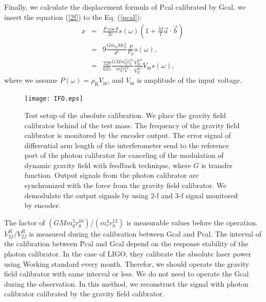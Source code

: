 \documentclass[%
 reprint,
superscriptaddress,
 amsmath,amssymb,
 aps,
]{revtex4-1}
\begin{document}
Finally, we calculate the displacement formula of Pcal calibrated by Gcal. we insert the equation (\ref{2f}) to the Eq. (\ref{pcal}):
\begin{eqnarray}
x&=&\frac{P \cos{\theta}}{2c} s(\omega)\left(1+\frac{M}{I}\vec{a} \cdot \vec{b} \right) \\
 &=&9\frac{Gm_{\mathrm{q}} M r_{\mathrm{q}}^2}{d^4}\frac{P}{P_{\mathrm{2f}}}s(\omega) , \\
 &=&\frac{729}{625} \frac{GM m^5_{\mathrm{q}} r_{\mathrm{q}}^{10}}{m^4_{\mathrm{h}} r_{\mathrm{h}}^{12} } \frac{{V_{\mathrm{3f}}^{R}}^4}{{V_{\mathrm{2f}}^{R}}^5}V_{\mathrm{in}} s(\omega)  , \label{pcal_new}
\end{eqnarray}
where we assume $P(\omega)=\rho_{\mathrm{R}} V_{\mathrm{in}}$, and $V_{\mathrm{in}}$ is amplitude of the input voltage.
\begin{figure}
\begin{center}
\texttt{[image: IFO.eps]}
\caption{Test setup of the absolute calibration. We place the gravity field calibrator behind of the test mass. The frequency of the gravity field calibrator is monitored by the encoder output. The error signal of differential arm length of the interferometer send to the reference port of the photon calibrator for canceling of the modulation of dynamic gravity field with feedback technique, where $G$ is transfer function. Output signals from the photon calibrator are synchronized with the force from the gravity field calibrator. We demodulate the output signals by using 2-f and 3-f signal monitored by encoder.}
\label{fig:IFO}
\end{center}
\end{figure}
The factor of $(GMm_q^5 r_q^10)/(m_r^4 r_h^{12})$ is measurable values before the operation.  $V^R_{3f}/V^R_{2f}$ is measured during the calibration between Gcal and Pcal. The interval of the calibration between Pcal and Gcal depend on the response stability of the photon calibrator. In the case of LIGO, they calibrate the absolute laser power using Working standard every month. Therefor, we should operate the gravity field calibrator with same interval or less. We do not need to operate the Gcal during the observation. In this method, we reconstruct the signal with photon calibrator calibrated by the gravity field calibrator. 
\end{document}
